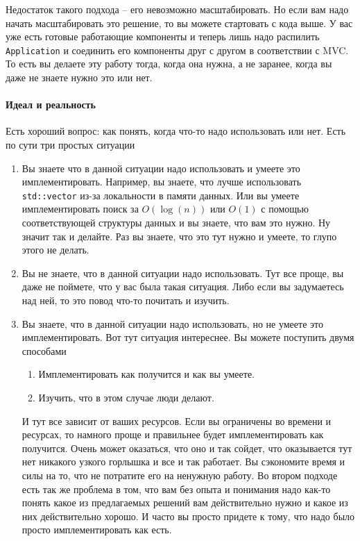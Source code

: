 Недостаток такого подхода -- его невозможно масштабировать.
Но если вам надо начать масштабировать это решение, то вы можете стартовать с кода выше.
У вас уже есть готовые работающие компоненты и теперь лишь надо распилить \verb"Application" и соединить его компоненты  друг с другом в соответствии с MVC.
То есть вы делаете эту работу тогда, когда она нужна, а не заранее, когда вы даже не знаете нужно это или нет.

\paragraph{Идеал и реальность}

Есть хороший вопрос: как понять, когда что-то надо использовать или нет.
Есть по сути три простых ситуации
\begin{enumerate}
\item Вы знаете что в данной ситуации надо использовать и умеете это имплементировать.
Например, вы знаете, что лучше использовать \verb"std::vector" из-за локальности в памяти данных.
Или вы умеете имплементировать поиск за $O(\log(n))$ или $O(1)$ с помощью соответствующей структуры данных и вы знаете, что вам это нужно.
Ну значит так и делайте.
Раз вы знаете, что это тут нужно и умеете, то глупо этого не делать.

\item Вы не знаете, что в данной ситуации надо использовать.
Тут все проще, вы даже не поймете, что у вас была такая ситуация.
Либо если вы задумаетесь над ней, то это повод что-то почитать и изучить.

\item Вы знаете, что в данной ситуации надо использовать, но не умеете это имплементировать.
Вот тут ситуация интереснее.
Вы можете поступить двумя способами
\begin{enumerate}
\item Имплементировать как получится и как вы умеете.

\item Изучить, что в этом случае люди делают.
\end{enumerate}
И тут все зависит от ваших ресурсов.
Если вы ограничены во времени и ресурсах, то намного проще и правильнее будет имплементировать как получится.
Очень может оказаться, что оно и так сойдет, что оказывается тут нет никакого узкого горлышка и все и так работает.
Вы сэкономите время и силы на то, что не потратите его на ненужную работу.
Во втором подходе есть так же проблема в том, что вам без опыта и понимания надо как-то понять какое из предлагаемых решений вам действительно нужно и какое из них действительно хорошо.
И часто вы просто придете к тому, что надо было просто имплементировать как есть.
\end{enumerate}
